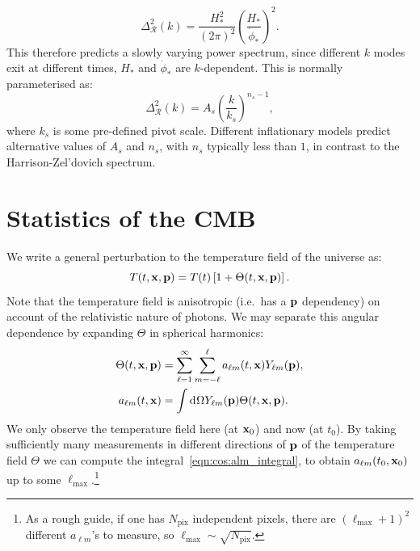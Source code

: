\begin{equation}
  \Delta_\mathcal{R}^2(k) = \frac{H_*^2}{{(2\pi)}^2}{\left( \frac{H_*}{\dot{\phi}_*} \right)}^2.
  \label{eqn:cos:inflation_power}
\end{equation}
This therefore predicts a slowly varying power spectrum, since different \(k\) modes exit at different times, \(H_*\) and \(\dot{\phi}_*\) are \(k\)-dependent. This is normally parameterised as:
\begin{equation}
  \Delta_\mathcal{R}^2(k) = A_s {\left( \frac{k}{k_s} \right)}^{n_s-1},
  \label{eqn:cos:lcdm_power}
\end{equation}
where \(k_s\) is some pre-defined pivot scale.
Different inflationary models predict alternative values of \(A_s\) and \(n_s\), with \(n_s\) typically less than \(1\), in contrast to the Harrison-Zel'dovich spectrum.








\section{Statistics of the CMB}
\label{cos:sec:CMB_stats}
We write a general perturbation to the temperature field of the universe as:
\begin{equation}
  T(t,\mathbf{x},\mathbf{p}) = T(t)\left[ 1+\Theta(t,\mathbf{x},\mathbf{p}) \right].
\end{equation}
Note that the temperature field is anisotropic (i.e.\ has a \(\mathbf{p}\) dependency) on account of the relativistic nature of photons. We may separate this angular dependence by expanding \(\Theta\) in spherical harmonics:
\begin{align}
  \Theta(t,\mathbf{x},\mathbf{p}) &= \sum_{\ell=1}^{\infty}\sum_{m=-\ell}^{\ell}a_{\ell m}(t,\mathbf{x}) Y_{\ell m}(\mathbf{p}),\\
  a_{\ell m}(t,\mathbf{x}) &= \int \operatorname{d}^{}\!{\Omega} Y_{\ell m}(\mathbf{p}) \Theta(t,\mathbf{x},\mathbf{p}).
  \label{eqn:cos:alm_integral}
\end{align}
We only observe the temperature field here (at \(\mathbf{x}_0\)) and now (at \(t_0\)). By taking sufficiently many measurements in different directions of \(\mathbf{p}\) of the temperature field \(\Theta\) we can compute the integral~\eqref{eqn:cos:alm_integral}, to obtain \(a_{\ell m}(t_0,\mathbf{x}_0)\) up to some \(\ell_{\max{}}\).\footnote{As a rough guide, if one has \(N_\mathrm{pix}\) independent pixels, there are \({(\ell_{\max{}}+1)}^2\) different \(a_{\ell m}\)'s to measure, so \(\ell_{\max{}} \sim \sqrt{N_\mathrm{pix}}\).}

